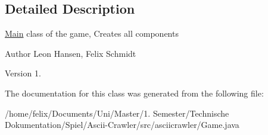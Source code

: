 \subsection{Detailed Description}
\hyperlink{classMain}{Main} class of the game, Creates all components

\begin{DoxyAuthor}{Author}
Leon Hansen, Felix Schmidt 
\end{DoxyAuthor}
\begin{DoxyVersion}{Version}
1. 
\end{DoxyVersion}


The documentation for this class was generated from the following file\+:\begin{DoxyCompactItemize}
\item 
/home/felix/\+Documents/\+Uni/\+Master/1. Semester/\+Technische Dokumentation/\+Spiel/\+Ascii-\/\+Crawler/src/asciicrawler/Game.\+java\end{DoxyCompactItemize}
